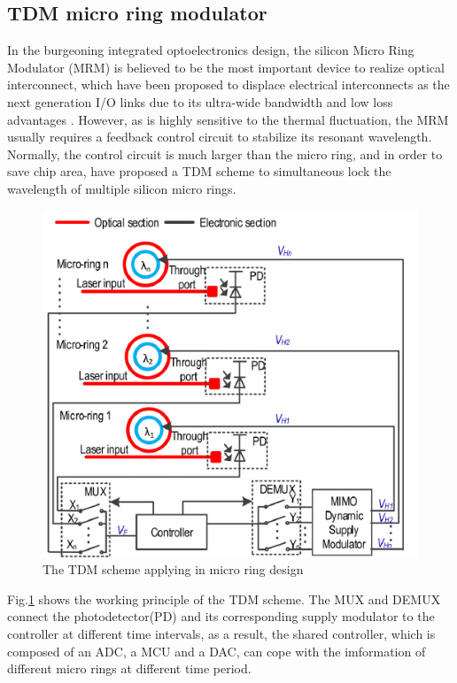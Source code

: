 \documentclass[journal]{IEEEtran}
\begin{document}
\subsection{TDM micro ring modulator}
In the burgeoning integrated optoelectronics design, the silicon Micro Ring Modulator (MRM) is believed to be the most important device to realize optical interconnect, which have been proposed to displace electrical interconnects as the next generation I/O links due to its ultra-wide bandwidth and low loss advantages \cite{wangzhicheng}. However, as is highly sensitive to the thermal fluctuation, the MRM usually requires a feedback control circuit to stabilize its resonant wavelength. Normally, the control circuit is much larger than the micro ring, and in order to save chip area, \cite{wangzhicheng} have proposed a TDM scheme to simultaneous lock the wavelength of multiple silicon micro rings.
\begin{figure}[t!]
    \centering
    \includegraphics[width=\linewidth]{pic/TDM/MRM.pdf}
    \caption{The TDM scheme applying in micro ring design}
    \label{fig:MRM}
\end{figure}

Fig.\ref{fig:MRM} shows the working principle of the TDM scheme. The MUX and DEMUX connect the photodetector(PD) and its corresponding supply modulator to the controller at different time intervals, as a result, the shared controller, which is composed of an ADC, a MCU and a DAC, can cope with the imformation of different micro rings at different time period.
\end{document}
